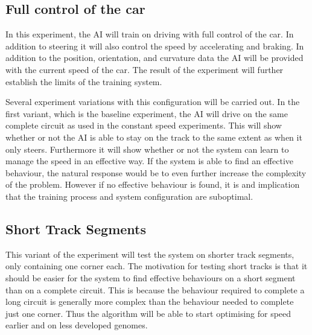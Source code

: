 \subsection{Full control of the car}
In this experiment, the AI will train on driving with full control of the car. In addition to steering it will also control the speed by accelerating and braking. In addition to the position, orientation, and curvature data the AI will be provided with the current speed of the car. The result of the experiment will further establish the limits of the training system. 

Several experiment variations with this configuration will be carried out. In the first variant, which is the baseline experiment, the AI will drive on the same complete circuit as used in the constant speed experiments. This will show whether or not the AI is able to stay on the track to the same extent as when it only steers. Furthermore it will show whether or not the system can learn to manage the speed in an effective way. If the system is able to find an effective behaviour, the natural response would be to even further increase the complexity of the problem. However if no effective behaviour is found, it is and implication that the training process and system configuration are suboptimal. 

\subsection{Short Track Segments}
This variant of the experiment will test the system on shorter track segments, only containing one corner each. The motivation for testing short tracks is that it should be easier for the system to find effective behaviours on a short segment than on a complete circuit. This is because the behaviour required to complete a long circuit is generally more complex than the behaviour needed to complete just one corner. Thus the algorithm will be able to start optimising for speed earlier and on less developed genomes. 

